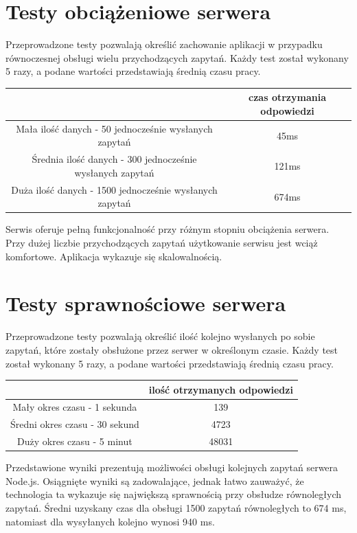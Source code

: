 \documentclass[12pt]{report}
\begin{document}
\section{Testy obciążeniowe serwera}
Przeprowadzone testy pozwalają określić zachowanie aplikacji w przypadku równoczesnej obsługi wielu przychodzących zapytań. Każdy test został wykonany 5 razy, a podane wartości przedstawiają średnią czasu pracy.
\smallskip
\begin{center}
  \begin{tabular}{ | c | c | }
    \hline
    & czas otrzymania odpowiedzi \\
    \hline
	Mała ilość danych - 50 jednocześnie wysłanych zapytań & 45ms \\
	\hline
	Średnia ilość danych - 300 jednocześnie wysłanych zapytań & 121ms \\
	\hline
	Duża ilość danych - 1500 jednocześnie wysłanych zapytań & 674ms \\
    \hline
  \end{tabular}
\end{center}
\bigskip\medskip

Serwis oferuje pełną funkcjonalność przy różnym stopniu obciążenia serwera. Przy dużej liczbie przychodzących zapytań użytkowanie serwisu jest wciąż komfortowe. Aplikacja wykazuje się skalowalnością.

\section{Testy sprawnościowe serwera}
Przeprowadzone testy pozwalają określić ilość kolejno wysłanych po sobie zapytań, które zostały obsłużone przez serwer w określonym czasie. Każdy test został wykonany 5 razy, a podane wartości przedstawiają średnią czasu pracy.
\bigskip \medskip
\begin{center}
  \begin{tabular}{ | c | c | }
    \hline
    & ilość otrzymanych odpowiedzi\\
    \hline
	Mały okres czasu - 1 sekunda & 139 \\
	\hline
	Średni okres czasu - 30 sekund & 4723 \\
	\hline
	Duży okres czasu - 5 minut & 48031 \\
    \hline
  \end{tabular}
\end{center}
\bigskip \medskip
Przedstawione wyniki prezentują możliwości obsługi kolejnych zapytań serwera Node.js. 
Osiągnięte wyniki są zadowalające, jednak łatwo zauważyć, że technologia ta wykazuje się największą sprawnością przy obsłudze równoległych zapytań. 
Średni uzyskany czas dla obsługi 1500 zapytań równoległych to 674 ms, natomiast dla wysyłanych kolejno wynosi 940 ms.
\end{document}
